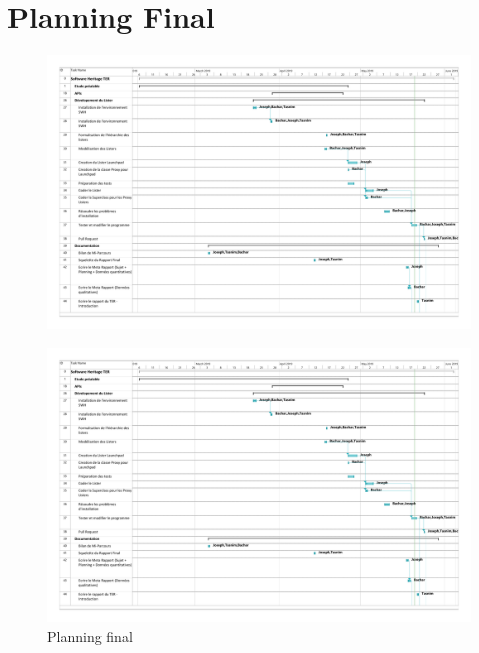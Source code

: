 \documentclass[12pt,a4paper]{report}
\begin{document}
\section{Planning Final}
\begin{figure}[!ht]
\hspace*{-3.5cm}
\includegraphics[scale=0.48]{pdfs/planning_final_summary.pdf}
\end{figure}

\begin{figure}[!ht]
\hspace*{-3.5cm}
\includegraphics[scale=0.48,page=2]{pdfs/planning_final_summary.pdf}
\caption{Planning final}
\end{figure}

\newpage
\end{document}
